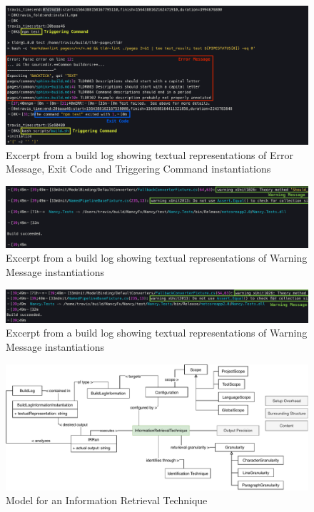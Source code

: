 \documentclass[\myrootdir/main.tex]{subfiles}
\begin{document}
\begin{figure}[htbp]
	\centering
	\includegraphics[width=\textwidth, clip]{img/log3.png}
	\caption{Excerpt from a build log showing textual representations of Error Message, Exit Code and Triggering Command instantiations}
	\label{fig:log-3}
\end{figure}
\begin{figure}[htbp]
	\centering
	\includegraphics[width=\textwidth, clip]{img/log4.png}
	\caption{Excerpt from a build log showing textual representations of Warning Message instantiations}
	\label{fig:log-4}
\end{figure}
\begin{figure}[htbp]
	\centering
	\includegraphics[width=\textwidth, clip]{img/log5.png}
	\caption{Excerpt from a build log showing textual representations of Warning Message instantiations}
	\label{fig:log-5}
\end{figure}


\begin{figure}[htbp]
	\centering
	\includegraphics[width=\textwidth, clip]{img/ir-technique.pdf}
	\caption{Model for an Information Retrieval Technique}
	\label{fig:model-ie-technique}
\end{figure}
\end{document}
